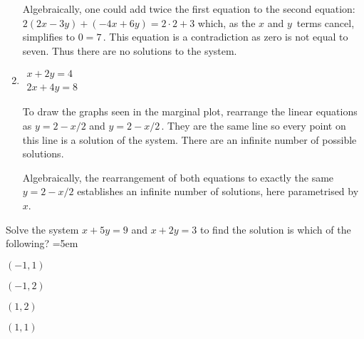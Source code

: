 \begin{example}
\begin{enumerate}
\begin{solution}
Algebraically, one could add twice the first equation to the second equation: \(2(2x-3y)+(-4x+6y)=2\cdot2+3\) which, as the \(x\) and \(y\)~terms cancel, simplifies to \(0=7\)\,. 
This equation is a contradiction as zero is not equal to seven.  
Thus there are no solutions to the system.
\end{solution}

\item \(\begin{array}{l} x+2y=4\\2x+4y=8 \end{array}\)
\begin{solution} 
To draw the graphs seen in the marginal plot, rearrange  the linear equations as \(y=2-x/2\) and \(y=2-x/2\)\,.  
%
They are the same line so every point on this line is a solution of the system.  
There are an infinite number of possible solutions.


Algebraically, the rearrangement of both equations to exactly the same \(y=2-x/2\) establishes an infinite number of solutions, here parametrised by~\(x\).
\end{solution}

\end{enumerate}
\end{example}




\begin{activity}
Solve the system \(x+5y=9\) and \(x+2y=3\) to find the solution is which of the following?
\partswidth=5em
\begin{parts}
\item \((-1,1)\)
\item \((-1,2)\)\actans
\item \((1,2)\)
\item \((1,1)\)
\end{parts}
\end{activity}





